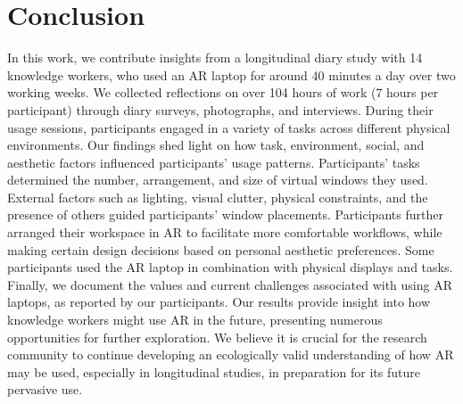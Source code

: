 \section{Conclusion}
In this work, we contribute insights from a longitudinal diary study with 14 knowledge workers, who used an AR laptop for around 40 minutes a day over two working weeks.
We collected reflections on over 104 hours of work (7 hours per participant) through diary surveys, photographs, and interviews. 
During their usage sessions, participants engaged in a variety of tasks across different physical environments. 
Our findings shed light on how task, environment, social, and aesthetic factors influenced participants' usage patterns. 
Participants' tasks determined the number, arrangement, and size of virtual windows they used. 
External factors such as lighting, visual clutter, physical constraints, and the presence of others guided participants' window placements.
Participants further arranged their workspace in AR to facilitate more comfortable workflows, 
while making certain design decisions based on personal aesthetic preferences. 
Some participants used the AR laptop in combination with physical displays and tasks. 
Finally, we document the values and current challenges associated with using AR laptops, as reported by our participants.
Our results provide insight into how knowledge workers might use AR in the future, presenting numerous opportunities for further exploration. 
We believe it is crucial for the research community to continue developing an ecologically valid understanding of how AR may be used, especially in longitudinal studies, in preparation for its future pervasive use.